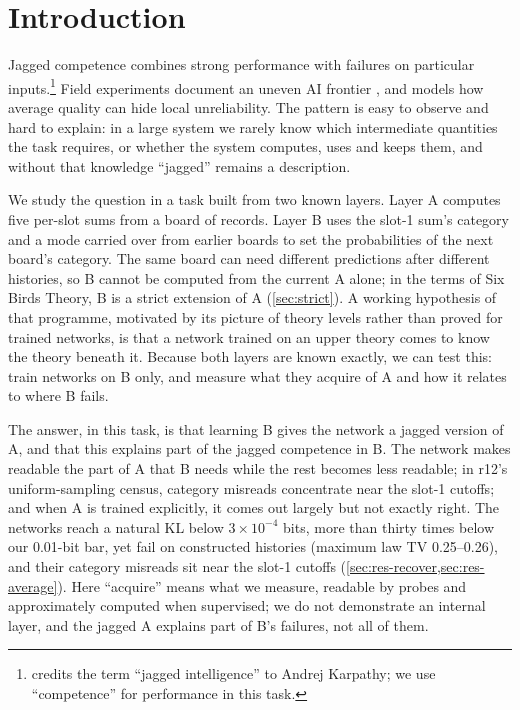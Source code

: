 \section{Introduction}\label{sec:intro}

Jagged competence combines strong performance with failures on particular
inputs.\footnote{\citet{gans2026} credits the term ``jagged intelligence''
to Andrej Karpathy; we use ``competence'' for performance in this task.}
Field experiments document an uneven AI frontier \citep{dellacqua2023}, and
\citet{gans2026} models how average quality can hide local unreliability. The
pattern is easy to observe and hard to explain: in a large system we rarely
know which intermediate quantities the task requires, or whether the system
computes, uses and keeps them, and without that knowledge ``jagged'' remains
a description.

We study the question in a task built from two known layers. Layer A computes
five per-slot sums from a board of records. Layer B uses the slot-1 sum's
category and a mode carried over from earlier boards to set the probabilities
of the next board's category. The same board can need different predictions
after different histories, so B cannot be computed from the current A alone;
in the terms of Six Birds Theory, B is a strict extension of A
(\cref{sec:strict}). A working hypothesis of that programme, motivated by its
picture of theory levels \citep[\S1.1]{tsiokos2026foundations} rather than
proved for trained networks, is that a network trained on an upper theory
comes to know the theory beneath it. Because both layers are known exactly,
we can test this: train networks on B only, and measure what they acquire of
A and how it relates to where B fails.

The answer, in this task, is that learning B gives the network a jagged
version of A, and that this explains part of the jagged competence in B. The
network makes readable the part of A that B needs while the rest becomes
less readable; in r12's uniform-sampling census, category misreads
concentrate near the slot-1 cutoffs; and when A is trained explicitly, it
comes out largely but not exactly right. The networks reach a natural KL below
$3\times10^{-4}$ bits, more than thirty times below our 0.01-bit bar, yet
fail on constructed histories (maximum law TV 0.25--0.26), and their category
misreads sit near the slot-1 cutoffs (\cref{sec:res-recover,sec:res-average}).
Here ``acquire'' means what we measure, readable by probes and approximately
computed when supervised; we do not demonstrate an internal layer, and the
jagged A explains part of B's failures, not all of them.

